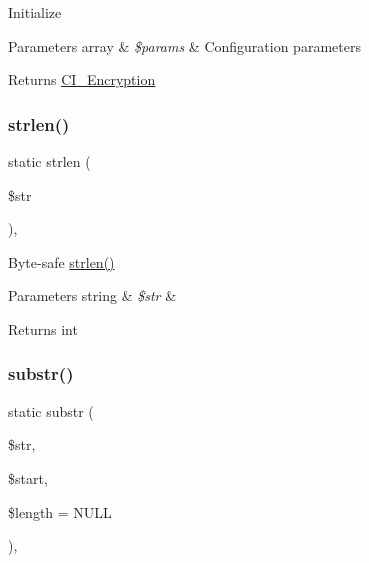 Initialize


\begin{DoxyParams}[1]{Parameters}
array & {\em \$params} & Configuration parameters \\
\hline
\end{DoxyParams}
\begin{DoxyReturn}{Returns}
\mbox{\hyperlink{class_c_i___encryption}{C\+I\+\_\+\+Encryption}} 
\end{DoxyReturn}
\mbox{\label{class_c_i___encryption_a4c29a687d4ed62c26a10e41d98930d5f}} 
\subsubsection{\texorpdfstring{strlen()}{strlen()}}
{\footnotesize\ttfamily static strlen (\begin{DoxyParamCaption}\item[{}]{\$str }\end{DoxyParamCaption})\hspace{0.3cm}{\ttfamily [static]}, {\ttfamily [protected]}}

Byte-\/safe \mbox{\hyperlink{class_c_i___encryption_a4c29a687d4ed62c26a10e41d98930d5f}{strlen()}}


\begin{DoxyParams}[1]{Parameters}
string & {\em \$str} & \\
\hline
\end{DoxyParams}
\begin{DoxyReturn}{Returns}
int 
\end{DoxyReturn}
\mbox{\label{class_c_i___encryption_a101caef57ef0b165da5747e2c2e6c9dc}} 
\subsubsection{\texorpdfstring{substr()}{substr()}}
{\footnotesize\ttfamily static substr (\begin{DoxyParamCaption}\item[{}]{\$str,  }\item[{}]{\$start,  }\item[{}]{\$length = {\ttfamily NULL} }\end{DoxyParamCaption})\hspace{0.3cm}{\ttfamily [static]}, {\ttfamily [protected]}}

